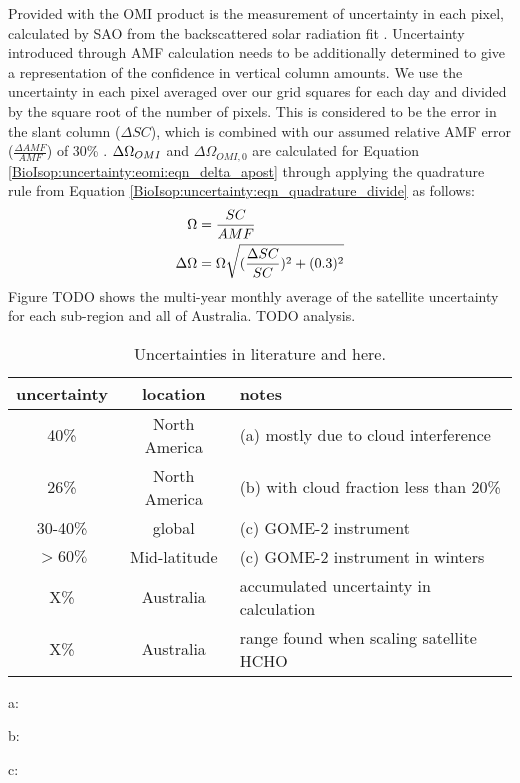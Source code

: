     Provided with the OMI product is the measurement of uncertainty in each pixel, calculated by SAO from the backscattered solar radiation fit \parencite{Abad2015,Abad2016}.
    Uncertainty introduced through AMF calculation needs to be additionally determined to give a representation of the confidence in vertical column amounts.
    We use the uncertainty in each pixel averaged over our \lowhr grid squares for each day and divided by the square root of the number of pixels.
    This is considered to be the error in the slant column ($\Delta SC$), which is combined with our assumed relative AMF error ($\frac{\Delta AMF}{AMF}$) of 30\% .
    $\Delta \Omega_{OMI}$ and $\Delta \Omega_{OMI,0}$ are calculated for Equation \ref{BioIsop:uncertainty:eomi:eqn_delta_apost} through applying the quadrature rule from Equation \ref{BioIsop:uncertainty:eqn_quadrature_divide} as follows:
    \begin{align}
    \Omega  & = \frac{SC}{AMF} \notag \\
    \Delta \Omega & = \Omega \sqrt{ ( \frac{\Delta SC}{SC} )^2 + ( 0.3 )^2 } 
    \end{align}
    Figure TODO shows the multi-year monthly average of the satellite uncertainty for each sub-region and all of Australia.
    TODO analysis.
    
    \begin{table}\begin{threeparttable}
      \caption{Uncertainties in literature and here.}
      \begin{tabular}{ c  c  l } 
        \toprule
        uncertainty & location & notes \\
        \midrule
        40\% & North America & (a) mostly due to cloud interference \\
        26\% & North America & (b) with cloud fraction less than 20\% \\
        30-40\% & global & (c) GOME-2 instrument \\
        $>60\%$ & Mid-latitude & (c) GOME-2 instrument in winters \\
        X\% & Australia & accumulated uncertainty in calculation \\
        X\% & Australia & range found when scaling satellite HCHO \\
        \bottomrule
      \end{tabular}
      \begin{tablenotes} 
        \item a: \textcite{Millet2006,Palmer2006}
        \item b: \textcite{Millet2008}
        \item c: \textcite{DeSmedt2008,DeSmedt2012}
      \end{tablenotes}
      \label{BioIsop:uncertainty:eomi:tab_lit_uncertainties}
    \end{threeparttable}\end{table}
    
